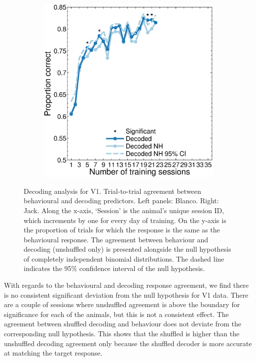 \begin{figure}[htbp]
\begin{subfigure}[b]{0.5\linewidth}
	\includegraphics[width=\linewidth]{./figures/ncl_decoding/agree_v1_jack.eps}
    \end{subfigure}
    \caption{%
    Decoding analysis for V1. Trial-to-trial agreement between behavioural and decoding predictors.
    Left panels: Blanco. Right: Jack.
	Along the x-axis, `Session' is the animal's unique session ID, which increments by one for every day of training.
    On the y-axis is the proportion of trials for which the response is the same as the behavioural response.
    The agreement between behaviour and decoding (unshuffled only) is presented alongside the null hypothesis of completely independent binomial distributions. The dashed line indicates the 95\% confidence interval of the null hypothesis.
}
    \label{fig:decag_all_v1}
\end{figure}


With regards to the behavioural and decoding response agreement, we find there is no consistent significant deviation from the null hypothesis for V1 data. There are a couple of sessions where unshuffled agreement is above the boundary for significance for each of the animals, but this is not a consistent effect. The agreement between shuffled decoding and behaviour does not deviate from the corresponding null hypothesis. This shows that the shuffled is higher than the unshuffled decoding agreement only because the shuffled decoder is more accurate at matching the target response.

